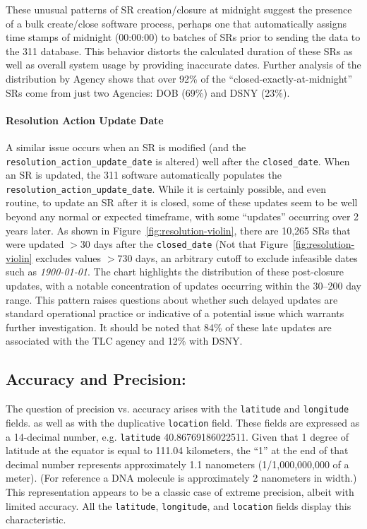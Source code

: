 \documentclass[linenumber]{jdsart}
\begin{document}
These unusual patterns of SR creation/closure at midnight 
suggest the presence of a bulk create/close software process, perhaps one
that automatically assigns time stamps of midnight (00:00:00) to 
 batches of SRs prior to sending the data to the 311 
database. This behavior distorts the calculated duration of these 
SRs as well as overall system usage by providing inaccurate 
dates. Further analysis of the distribution by Agency shows that over 92\% of 
the ``closed-exactly-at-midnight'' SRs come from just two 
Agencies: DOB (69\%) and DSNY  (23\%).


\paragraph{Resolution Action Update Date}
A similar issue occurs when an SR is modified (and the \texttt{resolution\_action\_update\_date} is altered) well 
after the \texttt{closed\_date}.  When an SR is 
updated, the 311 software automatically populates the \texttt{resolution\_action\_update\_date}. While it is certainly 
possible, and even routine, to update an SR after it is closed, 
some of these updates seem to be well beyond any 
normal or expected timeframe, with some ``updates'' 
occurring over 2 years later. As shown in Figure~\ref{fig:resolution-violin}, 
there are 10,265 SRs that were updated $>30$ days after the 
\texttt{closed\_date} (Not that Figure~\ref{fig:resolution-violin} excludes 
values $>730$ days, an arbitrary cutoff to exclude 
infeasible dates such as \textit{1900-01-01}. The chart 
highlights the distribution of these post-closure 
 updates, with a notable concentration of updates occurring within 
the 30--200 day range. This pattern raises 
questions about whether such delayed updates are standard 
operational practice or indicative of a potential issue 
which warrants further investigation. It should be noted
that 84\% of these late updates are associated with the TLC agency
and 12\% with DSNY.


\subsection{Accuracy and Precision:}
\label{sec:precision}
The question of precision vs. accuracy arises with the \texttt{latitude} 
and \texttt{longitude} fields. as well as with the duplicative 
\texttt{location} field. These fields are expressed as
a 14-decimal number, e.g. \texttt{latitude} 40.86769186022511. 
Given that 1 degree of latitude at the equator is equal to 111.04 
kilometers, the ``1'' at the end of that decimal number represents 
approximately 1.1 nanometers (1/1,000,000,000 of a meter). (For 
reference a DNA molecule is approximately 2 nanometers in width.) This 
representation appears to be a classic case of extreme precision, albeit with limited 
accuracy. All the \texttt{latitude}, \texttt{longitude}, and \texttt{location}
fields display this characteristic. 
\end{document}
